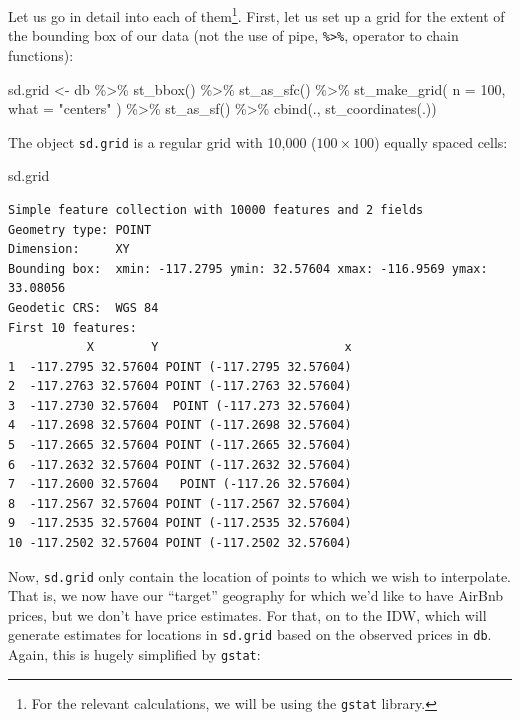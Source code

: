 \documentclass[
  letterpaper,
  DIV=11,
  numbers=noendperiod,
  oneside]{scrreprt}
\newenvironment{Shaded}{\begin{snugshade}}{\end{snugshade}}
\newcommand{\AttributeTok}[1]{\textcolor[rgb]{0.40,0.45,0.13}{#1}}
\newcommand{\DecValTok}[1]{\textcolor[rgb]{0.68,0.00,0.00}{#1}}
\newcommand{\FunctionTok}[1]{\textcolor[rgb]{0.28,0.35,0.67}{#1}}
\newcommand{\NormalTok}[1]{\textcolor[rgb]{0.00,0.23,0.31}{#1}}
\newcommand{\OtherTok}[1]{\textcolor[rgb]{0.00,0.23,0.31}{#1}}
\newcommand{\SpecialCharTok}[1]{\textcolor[rgb]{0.37,0.37,0.37}{#1}}
\newcommand{\StringTok}[1]{\textcolor[rgb]{0.13,0.47,0.30}{#1}}
\begin{document}
Let us go in detail into each of them\footnote{For the relevant
  calculations, we will be using the \texttt{gstat} library.}. First,
let us set up a grid for the extent of the bounding box of our data (not
the use of pipe, \texttt{\%\textgreater{}\%}, operator to chain
functions):

\begin{Shaded}
\begin{Highlighting}[]
\NormalTok{sd.grid }\OtherTok{\textless{}{-}}\NormalTok{ db }\SpecialCharTok{\%\textgreater{}\%}
  \FunctionTok{st\_bbox}\NormalTok{() }\SpecialCharTok{\%\textgreater{}\%}
  \FunctionTok{st\_as\_sfc}\NormalTok{() }\SpecialCharTok{\%\textgreater{}\%}
  \FunctionTok{st\_make\_grid}\NormalTok{(}
    \AttributeTok{n =} \DecValTok{100}\NormalTok{,}
    \AttributeTok{what =} \StringTok{"centers"}
\NormalTok{  ) }\SpecialCharTok{\%\textgreater{}\%}
  \FunctionTok{st\_as\_sf}\NormalTok{() }\SpecialCharTok{\%\textgreater{}\%}
  \FunctionTok{cbind}\NormalTok{(., }\FunctionTok{st\_coordinates}\NormalTok{(.))}
\end{Highlighting}
\end{Shaded}

The object \texttt{sd.grid} is a regular grid with 10,000
(\(100 \times 100\)) equally spaced cells:

\begin{Shaded}
\begin{Highlighting}[]
\NormalTok{sd.grid}
\end{Highlighting}
\end{Shaded}

\begin{verbatim}
Simple feature collection with 10000 features and 2 fields
Geometry type: POINT
Dimension:     XY
Bounding box:  xmin: -117.2795 ymin: 32.57604 xmax: -116.9569 ymax: 33.08056
Geodetic CRS:  WGS 84
First 10 features:
           X        Y                          x
1  -117.2795 32.57604 POINT (-117.2795 32.57604)
2  -117.2763 32.57604 POINT (-117.2763 32.57604)
3  -117.2730 32.57604  POINT (-117.273 32.57604)
4  -117.2698 32.57604 POINT (-117.2698 32.57604)
5  -117.2665 32.57604 POINT (-117.2665 32.57604)
6  -117.2632 32.57604 POINT (-117.2632 32.57604)
7  -117.2600 32.57604   POINT (-117.26 32.57604)
8  -117.2567 32.57604 POINT (-117.2567 32.57604)
9  -117.2535 32.57604 POINT (-117.2535 32.57604)
10 -117.2502 32.57604 POINT (-117.2502 32.57604)
\end{verbatim}

Now, \texttt{sd.grid} only contain the location of points to which we
wish to interpolate. That is, we now have our ``target'' geography for
which we'd like to have AirBnb prices, but we don't have price
estimates. For that, on to the IDW, which will generate estimates for
locations in \texttt{sd.grid} based on the observed prices in
\texttt{db}. Again, this is hugely simplified by \texttt{gstat}:
\end{document}
